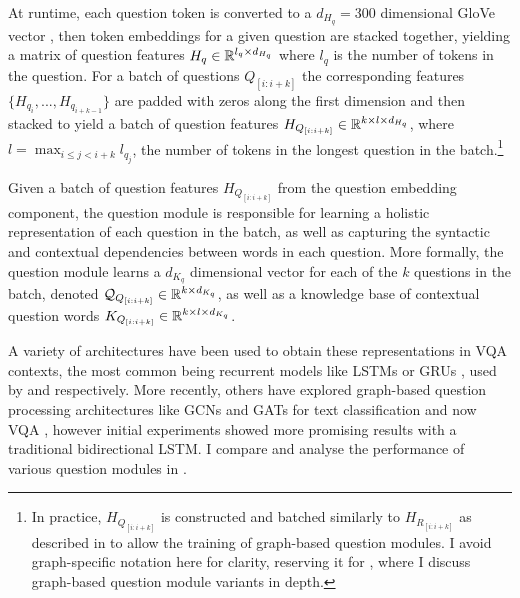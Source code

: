 At runtime, each question token is converted to a \(d_{H_q} = 300\) dimensional GloVe vector \cite{pennington2014glove}, then token embeddings for a given question are stacked together, yielding a matrix of question features \(H_q \in \mathbb{R}^{l_q \times d_{H_q}}\) where \(l_q\) is the number of tokens in the question. For a batch of questions \(Q_{[i:i+k]}\) the corresponding features \(\{H_{q_i}, ..., H_{q_{i+k-1}}\}\) are padded with zeros along the first dimension and then stacked to yield a batch of question features \(H_{Q_{[i:i+k]}} \in \mathbb{R}^{k \times l \times d_{H_q}}\), where \(l = \max_{i \leq j < i+k} l_{q_j}\), the number of tokens in the longest question in the batch.\footnote{In practice, \(H_{Q_{[i:i+k]}}\) is constructed and batched similarly to \(H_{R_{[i:i+k]}}\) as described in \subsectionautorefname{ \ref{sec:scene_graph_embedding_details}} to allow the training of graph-based question modules. I avoid graph-specific notation here for clarity, reserving it for \subsectionautorefname{ \ref{subsec:question_module_ablations}}, where I discuss graph-based question module variants in depth.}




Given a batch of question features \(H_{Q_{[i:i+k]}}\) from the question embedding component, the question module is responsible for learning a holistic representation of each question in the batch, as well as capturing the syntactic and contextual dependencies between words in each question. More formally, the question module learns a  \(d_{K_q}\) dimensional vector for each of the \(k\) questions in the batch, denoted \(\mathcal{Q}_{Q_{[i:i+k]}} \in \mathbb{R}^{k \times d_{K_q}}\), as well as a knowledge base of contextual question words \(K_{Q_{[i:i+k]}} \in \mathbb{R}^{k \times l \times d_{K_q}}\).

A variety of architectures have been used to obtain these representations in VQA contexts, the most common being recurrent models like LSTMs \cite{hochreiter1997long} or GRUs \cite{cho2014learning}, used by \cite{perez2017film, hudson2018compositional, lu2016hierarchical, yu2019deep} and \cite{anderson2018bottom, teney2018tips, li2019relation, liu2019densely, gao2019dynamic, kim2018bilinear} respectively. More recently, others have explored graph-based question processing architectures like GCNs and GATs for text classification \cite{yao2019graph, liu2020tensor} and now VQA \cite{huang2020aligned}, however initial experiments showed more promising results with a traditional bidirectional LSTM. I compare and analyse the performance of various question modules in \subsectionautorefname{ \ref{subsec:question_module_ablations}}.

